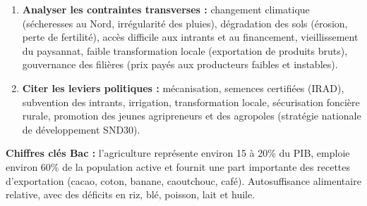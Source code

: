 \documentclass[11pt]{article}
\begin{document}
\begin{methode}
\begin{enumerate}
\begin{itemize}
        \item \textbf{Hautes terres (Ouest, Nord-Ouest) :} café arabica, légumes de climat tempéré (pomme de terre, carotte), haricot, maïs, élevage bovin.
        \textbf{Zone soudanienne (Nord, Adamaoua) :} coton, mil, sorgho, maïs, arachide, niébé, oignon, élevage bovin extensif.
        \item \textbf{Zone sahélienne (Extrême-Nord) :} mil, sorgho, riz (plaines inondables du Logone et du Mayo-Danay), coton, arachide, élevage transhumant.
    \end{itemize}
    \item \textbf{Analyser les contraintes transverses :} changement climatique (sécheresses au Nord, irrégularité des pluies), dégradation des sols (érosion, perte de fertilité), accès difficile aux intrants et au financement, vieillissement du paysannat, faible transformation locale (exportation de produits bruts), gouvernance des filières (prix payés aux producteurs faibles et instables).
    \item \textbf{Citer les leviers politiques :} mécanisation, semences certifiées (IRAD), subvention des intrants, irrigation, transformation locale, sécurisation foncière rurale, promotion des jeunes agripreneurs et des agropoles (stratégie nationale de développement SND30).
\end{enumerate}
\textbf{Chiffres clés Bac :} l'agriculture représente environ 15 à 20\% du PIB, emploie environ 60\% de la population active et fournit une part importante des recettes d'exportation (cacao, coton, banane, caoutchouc, café). Autosuffisance alimentaire relative, avec des déficits en riz, blé, poisson, lait et huile.
\end{methode}
\end{document}
